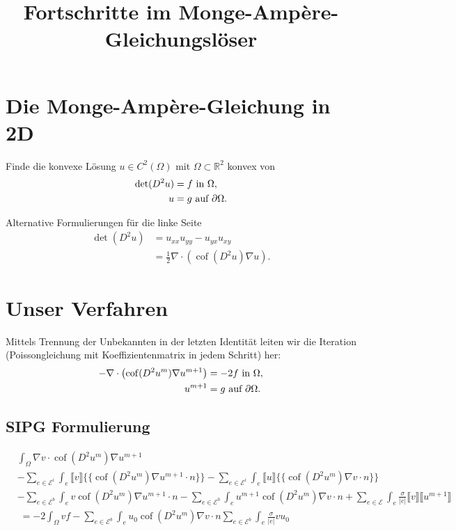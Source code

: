 \documentclass[a4paper,11pt]{article}
\title{Fortschritte im Monge-Ampère-Gleichungslöser}
\newcommand{\R}{\mathbb{R}}
\newcommand{\cof}{\operatorname{cof}}
\newcommand{\bigEps}{\mathcal{E}}
\begin{document}
\maketitle

\section*{Die Monge-Ampère-Gleichung in 2D}

Finde die konvexe Lösung $u \in C^2(\Omega)$ mit $\Omega \subset \R^2$ konvex von
\begin{align*}
	\det(D^2 u)&= f \textnormal{ in }\Omega, \\
	u &= g \textnormal{ auf } \partial \Omega.
\end{align*}	

Alternative Formulierungen für die linke Seite
\begin{align*}
  \det(D^2u) &= u_{xx}u_{yy} - u_{yx}u_{xy}\\
                   &= \frac 1 2 \nabla \cdot \left(  \cof(D^2u) \nabla u \right).
\end{align*}

\section*{Unser Verfahren}
Mittels Trennung der Unbekannten in der letzten Identität leiten wir die Iteration (Poissongleichung mit Koeffizientenmatrix in jedem Schritt) her:
\begin{align*}
	-\nabla \cdot \left( \cof(D^2 u^m) \nabla u^{m+1} \right) &= -2f \textnormal{ in }\Omega, \\
	u^{m+1} &= g \textnormal{ auf } \partial \Omega. 
\end{align*}	

\subsection*{SIPG Formulierung}
\begin{align*}
 &\int_{\Omega} \nabla v \cdot \cof(D^2 u^{m}) \nabla u^{m+1}\\
 & -\sum\limits_{e \in \bigEps^i}\int_{e} \llbracket v \rrbracket \{\{ \cof(D^2 u^{m}) \nabla u^{m+1}\cdot n \}\} 
 - \sum\limits_{e \in \bigEps^i}\int_{e} \llbracket u\rrbracket \{\{ \cof(D^2 u^{m}) \nabla v \cdot n \}\} \\  
 & - \sum\limits_{e \in \bigEps^b}\int_{e} v \cof(D^2 u^{m}) \nabla u^{m+1}\cdot n 
    - \sum\limits_{e \in \bigEps^b}\int_{e} u^{m+1}\cof(D^2 u^{m}) \nabla v \cdot n
    +\sum\limits_{e \in \bigEps} \int_e \frac \sigma {|e|} \llbracket v \rrbracket \llbracket u^{m+1}\rrbracket \\
    &\;= - 2 \int_{\Omega}v f
    	 				-\sum\limits_{e \in \bigEps^b}\int_{e} u_0 \cof(D^2 u^{m}) \nabla v \cdot n 
    	 				\sum\limits_{e \in \bigEps^b} \int_e \frac \sigma {|e|} v u_0    
\end{align*}
\end{document}
